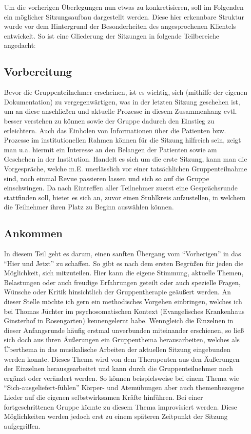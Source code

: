 Um die vorherigen Überlegungen nun etwas zu konkretisieren, soll im Folgenden ein möglicher Sitzungsaufbau dargestellt werden. Diese hier erkennbare Struktur wurde vor dem Hintergrund der Besonderheiten des angesprochenen Klientels entwickelt. So ist eine Gliederung der Sitzungen in folgende Teilbereiche angedacht:

\subsection*{Vorbereitung}
Bevor die Gruppenteilnehmer erscheinen, ist es wichtig, sich (mithilfe der eigenen Dokumentation) zu vergegenwärtigen, was in der letzten Sitzung geschehen ist, um an diese anschließen und aktuelle Prozesse in diesem Zusammenhang evtl. besser verstehen zu können sowie der Gruppe dadurch den Einstieg zu erleichtern. Auch das Einholen von Informationen über die Patienten bzw. Prozesse im institutionellen Rahmen können für die Sitzung hilfreich sein, zeigt man u.a. hiermit ein Interesse an den Belangen der Patienten sowie am Geschehen in der Institution. Handelt es sich um die erste Sitzung, kann man die Vorgespräche, welche m.E. unerlässlich vor einer tatsächlichen Gruppenteilnahme sind, noch einmal Revue passieren lassen und sich so auf die Gruppe einschwingen.
Da nach Eintreffen aller Teilnehmer zuerst eine Gesprächsrunde stattfinden soll, bietet es sich an, zuvor einen Stuhlkreis aufzustellen, in welchem die Teilnehmer ihren Platz zu Beginn auswählen können. 

\subsection*{Ankommen}
In diesem Teil geht es darum, einen sanften Übergang vom "`Vorherigen"' in das "`Hier und Jetzt"' zu schaffen. So gibt es nach dem ersten Begrüßen für jeden die Möglichkeit, sich mitzuteilen. Hier kann die eigene Stimmung, aktuelle Themen, Belastungen oder auch freudige Erfahrungen geteilt oder auch spezielle Fragen, Wünsche oder Kritik hinsichtlich der Gruppentherapie geäußert werden. An dieser Stelle möchte ich gern ein methodisches Vorgehen einbringen, welches ich bei Thomas Jüchter im psychosomatischen Kontext (Evangelisches Krankenhaus Ginsterhof in Rosengarten) kennengelernt habe. Wenngleich die Einzelnen in dieser Anfangsrunde häufig erstmal unverbunden miteinander erschienen, so ließ sich doch aus ihren Äußerungen ein Gruppenthema herausarbeiten, welches als Überthema in das musikalische Arbeiten der aktuellen Sitzung eingebunden werden konnte. Dieses Thema wird von dem Therapeuten aus den Äußerungen der Einzelnen herausgearbeitet und kann durch die Gruppenteilnehmer noch ergänzt oder verändert werden. So können beispielsweise bei einem Thema wie "`Sich-ausgeliefert-fühlen"' Körper- und Atemübungen aber auch themenbezogene Lieder auf die eigenen selbstwirksamen Kräfte hinführen. Bei einer fortgeschrittenen Gruppe könnte zu diesem Thema improvisiert werden. Diese Möglichkeiten werden jedoch erst zu einem späteren Zeitpunkt der Sitzung aufgegriffen. 

